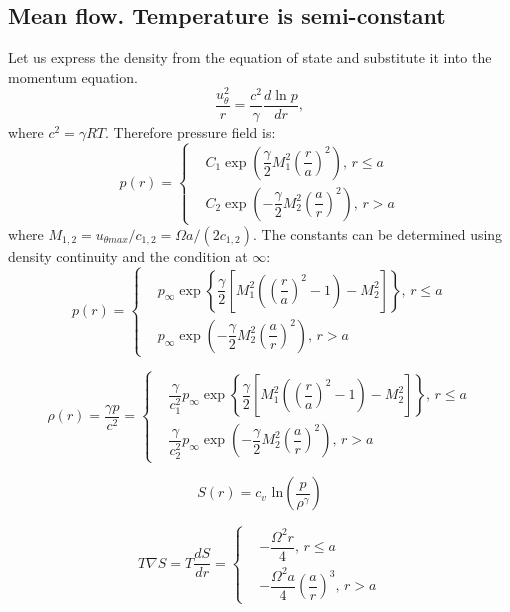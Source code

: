 \subsection{Mean flow. Temperature is semi-constant}

Let us express the density from the equation of state and substitute it into the momentum equation.
\begin{equation}
	\dfrac{u_{\theta}^2}{r} = \dfrac{c^2}{\gamma} \dfrac{d \ln p}{dr},
\end{equation}
where $c^2 = \gamma R T$. Therefore pressure field is:
\begin{equation}
	p(r) = \left\{
	\begin{aligned}
		& C_1 \exp \left( \dfrac{\gamma}{2}M_1^2 \left(\dfrac{r}{a}\right)^2\right), \, r \leqslant a \\
		& C_2 \exp \left( - \dfrac{\gamma}{2}M_2^2 \left(\dfrac{a}{r}\right)^2\right), \, r > a
	\end{aligned}
	\right.
\end{equation}
where $M_{1,2} = u_{\theta max} / c_{1,2} = \Omega a/(2c_{1,2})$. The constants can be determined using density continuity and the condition at $\infty$:
\begin{equation}
	p(r) = \left\{
	\begin{aligned}
		& p_{\infty} \exp \left\{\dfrac{\gamma}{2} \left[M_1^2 \left(\left(\dfrac{r}{a}\right)^2 - 1 \right) - M_2^2 \right]\right\}, \, r \leqslant a \\
		& p_{\infty} \exp \left( - \dfrac{\gamma}{2}M_2^2 \left(\dfrac{a}{r}\right)^2\right), \, r > a
	\end{aligned}
	\right.
\end{equation}

\begin{equation}
	\rho(r) = \dfrac{\gamma p}{c^2} = \left\{
	\begin{aligned}
		& \dfrac{\gamma}{c_1^2} p_{\infty} \exp \left\{\dfrac{\gamma}{2} \left[M_1^2 \left(\left(\dfrac{r}{a}\right)^2 - 1 \right) - M_2^2 \right]\right\}, \, r \leqslant a \\
		& \dfrac{\gamma}{c_2^2}p_{\infty} \exp \left( - \dfrac{\gamma}{2}M_2^2 \left(\dfrac{a}{r}\right)^2\right), \, r > a
	\end{aligned}
	\right.
\end{equation}

\begin{equation}
	S(r) = c_{v} \text{ ln} \left(\dfrac{p}{\rho^{\gamma}}\right)
\end{equation}

\begin{equation}
	T\nabla S = T \dfrac{dS}{dr} = \left\{
	\begin{aligned}
		& - \dfrac{\Omega^2 r}{4}, \, r \leqslant a \\
		& - \dfrac{\Omega^2 a}{4} \left(\dfrac{a}{r}\right)^3, \, r > a
	\end{aligned}
	\right.
\end{equation}
